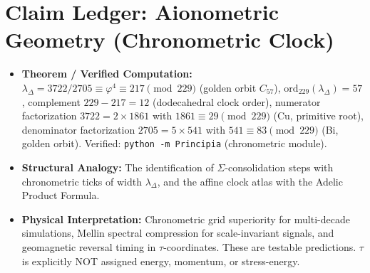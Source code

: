 \section*{Claim Ledger: Aionometric Geometry (Chronometric Clock)}
\begin{itemize}[noitemsep]
    \item \textbf{Theorem / Verified Computation:} $\lambda_\Delta = 3722/2705 \equiv \varphi^4 \equiv 217 \pmod{229}$ (golden orbit $C_{57}$), $\mathrm{ord}_{229}(\lambda_\Delta) = 57$, complement $229 - 217 = 12$ (dodecahedral clock order), numerator factorization $3722 = 2 \times 1861$ with $1861 \equiv 29 \pmod{229}$ (Cu, primitive root), denominator factorization $2705 = 5 \times 541$ with $541 \equiv 83 \pmod{229}$ (Bi, golden orbit). Verified: \texttt{python -m Principia} (chronometric module).
    \item \textbf{Structural Analogy:} The identification of $\Sigma$-consolidation steps with chronometric ticks of width $\lambda_\Delta$, and the affine clock atlas with the Adelic Product Formula.
    \item \textbf{Physical Interpretation:} Chronometric grid superiority for multi-decade simulations, Mellin spectral compression for scale-invariant signals, and geomagnetic reversal timing in $\tau$-coordinates.  These are testable predictions.  $\tau$ is explicitly NOT assigned energy, momentum, or stress-energy.
\end{itemize}




